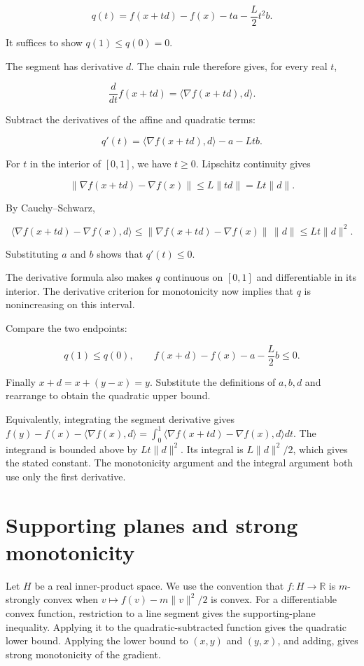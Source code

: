 \documentclass[11pt,a4paper]{article}
\begin{document}
\[q(t)=f(x+td)-f(x)-ta-\frac L2t^2b.\]

It suffices to show \(q(1)\le q(0)=0\).



The segment has derivative \(d\). The chain rule therefore gives, for every real \(t\),

\[\frac{d}{dt}f(x+td)=\langle\nabla f(x+td),d\rangle.\]

Subtract the derivatives of the affine and quadratic terms:

\[q'(t)=\langle\nabla f(x+td),d\rangle-a-Ltb.\]

For \(t\) in the interior of \([0,1]\), we have \(t\ge0\). Lipschitz continuity gives

\[\|\nabla f(x+td)-\nabla f(x)\|\le L\|td\|=Lt\|d\|.\]

By Cauchy–Schwarz,

\[\langle\nabla f(x+td)-\nabla f(x),d\rangle\le\|\nabla f(x+td)-\nabla f(x)\|\,\|d\|\le Lt\|d\|^2.\]

Substituting \(a\) and \(b\) shows that \(q'(t)\le0\).



The derivative formula also makes \(q\) continuous on \([0,1]\) and differentiable in its interior. The derivative criterion for monotonicity now implies that \(q\) is nonincreasing on this interval.



Compare the two endpoints:

\[q(1)\le q(0),\qquad f(x+d)-f(x)-a-\frac L2b\le0.\]

Finally \(x+d=x+(y-x)=y\). Substitute the definitions of \(a,b,d\) and rearrange to obtain the quadratic upper bound.



Equivalently, integrating the segment derivative gives \(f(y)-f(x)-\langle\nabla f(x),d\rangle=\int_0^1\langle\nabla f(x+td)-\nabla f(x),d\rangle dt\). The integrand is bounded above by \(Lt\|d\|^2\). Its integral is \(L\|d\|^2/2\), which gives the stated constant. The monotonicity argument and the integral argument both use only the first derivative.


\section{\texorpdfstring{Supporting planes and strong monotonicity}{Supporting planes and strong monotonicity}}


Let \(H\) be a real inner-product space. We use the convention that \(f:H\to\mathbb R\) is \(m\)-strongly convex when \(v\mapsto f(v)-m\|v\|^2/2\) is convex. For a differentiable convex function, restriction to a line segment gives the supporting-plane inequality. Applying it to the quadratic-subtracted function gives the quadratic lower bound. Applying the lower bound to \((x,y)\) and \((y,x)\), and adding, gives strong monotonicity of the gradient.
\end{document}
